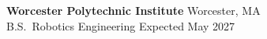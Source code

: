 \textbf{Worcester Polytechnic Institute} \hfill Worcester, MA\\
B.S.\ Robotics Engineering \hfill Expected May 2027
